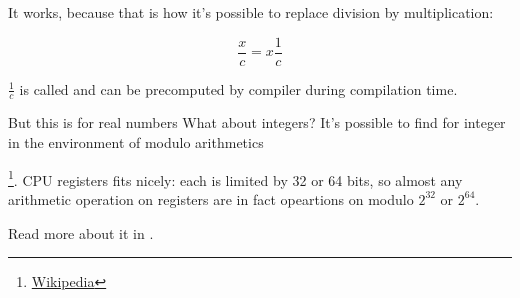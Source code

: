 It works, because that is how it's possible to replace division by multiplication:

\[
	\frac{x}{c} = x\frac{1}{c}
\]

$\frac{1}{c}$ is called  and can be precomputed by compiler during compilation
time.

But this is for real numbers
What about integers?
It's possible to find  for integer in the environment of modulo arithmetics

\footnote{\href{http://go.yurichev.com/17359}{Wikipedia}}.
\ac{CPU} registers fits nicely: each is limited by 32 or 64 bits, so almost any arithmetic operation on registers are in fact
opeartions on modulo $2^{32}$ or $2^{64}$.

Read more about it in .


